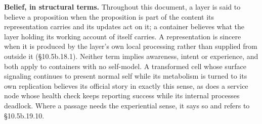 \documentclass[
]{article}
\begin{document}
\textbf{Belief, in structural terms.} Throughout this document, a layer
is said to believe a proposition when the proposition is part of the
content its representation carries and its updates act on it; a
container believes what the layer holding its working account of itself
carries. A representation is sincere when it is produced by the layer's
own local processing rather than supplied from outside it (§10.5b.18.1).
Neither term implies awareness, intent or experience, and both apply to
containers with no self-model. A transformed cell whose surface
signaling continues to present normal self while its metabolism is
turned to its own replication believes its official story in exactly
this sense, as does a service node whose health check keeps reporting
success while its internal processes deadlock. Where a passage needs the
experiential sense, it says so and refers to §10.5b.19.10.
\end{document}
